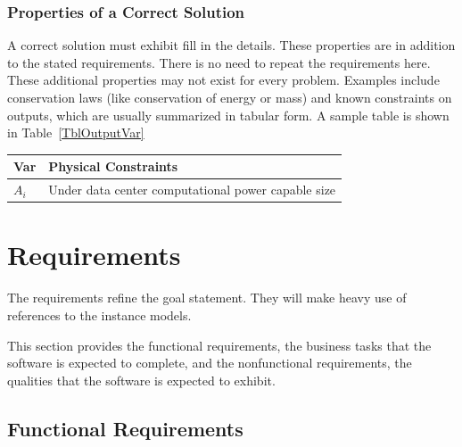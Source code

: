\documentclass[12pt]{article}
\begin{document}
\subsubsection{Properties of a Correct Solution} \label{sec_CorrectSolution}

\noindent
A correct solution must exhibit {fill in the details}.  {These
  properties are in addition to the stated requirements.  There is no need to
  repeat the requirements here.  These additional properties may not exist for
  every problem.  Examples include conservation laws (like conservation of
  energy or mass) and known constraints on outputs, which are usually summarized
  in tabular form.  A sample table is shown in Table~\ref{TblOutputVar}}

\begin{table}[!h]
\caption{Output Variables} \label{TblOutputVar}
\renewcommand{\arraystretch}{1.2}
\noindent \begin{longtable*}{l l} 
  \toprule
  \textbf{Var} & \textbf{Physical Constraints} \\
  \midrule 
  $A_i$ & Under data center computational power capable size
  \\
  \bottomrule
\end{longtable*}
\end{table}


\section{Requirements}

{The requirements refine the goal statement.  They will make heavy use of
  references to the instance models.}

This section provides the functional requirements, the business tasks that the
software is expected to complete, and the nonfunctional requirements, the
qualities that the software is expected to exhibit.

\subsection{Functional Requirements}
\end{document}

